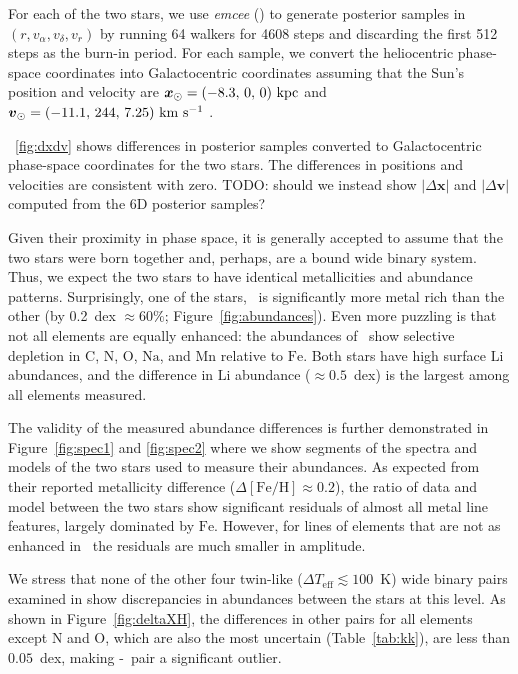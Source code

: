 \documentclass[modern, letterpaper]{aastex61}
\newcommand{\project}[1]{\textsl{#1}}
\newcommand{\figname}{Figure}
\newcommand*\elem[1]{\ensuremath{\mathrm{#1}}}
\newcommand*\elemH[1]{\ensuremath{[\mathrm{#1}/\elem{H}]}}
\newcommand*{\feh}{\ensuremath{\elemH{Fe}}}
\newcommand{\sunanalog}{\text{Krios}}
\newcommand{\bizarreone}{\text{Kronos}}
\newcommand{\bs}[1]{\boldsymbol{#1}}
\renewcommand{\vec}[1]{\bs{#1}}
\newcommand{\kms}{\ensuremath{\rm km~s^{-1}}}
\newcommand{\todo}[1]{{\color{blue}TODO: #1}}
\renewcommand\tablename{Table}
\begin{document}
%
For each of the two stars, we use \project{emcee}
(\citealt{2013PASP..125..306F}) to generate posterior samples in $(r, v_\alpha,
v_\delta, v_r)$ by running 64 walkers for 4608 steps and discarding the first
512 steps as the burn-in period.
For each sample, we convert the heliocentric phase-space coordinates into
Galactocentric coordinates assuming that the Sun's position and velocity are
$\vec x_\odot = (-8.3,\,0,\,0)~{\rm kpc}$ and $\vec v_\odot =
(-11.1,\,244,\,7.25)~\kms$ \citep[e.g.,][]{Schonrich:2010, Schonrich:2012}.

\figurename~\ref{fig:dxdv} shows differences in posterior samples converted to
Galactocentric phase-space coordinates for the two stars.
The differences in positions and velocities are consistent with zero.
\todo{should we instead show $|\Delta\boldsymbol{x}|$ and
$|\Delta\boldsymbol{v}|$ computed from the 6D posterior samples?}

Given their proximity in phase space, it is generally accepted to assume that
the two stars were born together and, perhaps, are a bound wide binary system.
Thus, we expect the two stars to have identical metallicities and abundance patterns.
Surprisingly, one of the stars, \bizarreone\ is significantly more metal
rich than the other (by 0.2~dex $\approx 60\%$; \figname~\ref{fig:abundances}).
Even more puzzling is that not all elements are equally enhanced:
the abundances of \bizarreone\ show selective depletion in
\elem{C}, \elem{N}, \elem{O}, \elem{Na}, and \elem{Mn}
relative to \elem{Fe}.
Both stars have high surface \elem{Li} abundances, and the difference in
\elem{Li} abundance ($\approx 0.5$~dex) is the largest among all elements
measured.

The validity of the measured abundance differences is further demonstrated
in \figname~\ref{fig:spec1} and \ref{fig:spec2} where we show
segments of the spectra and models of the two stars
used to measure their abundances.
As expected from their reported metallicity difference ($\Delta\feh \approx 0.2$),
the ratio of data and model between the two stars show significant
residuals of almost all metal line features, largely dominated by \elem{Fe}.
However, for lines of elements that are not as enhanced in \bizarreone\,
the residuals are much smaller in amplitude.


We stress that none of the other four twin-like ($\Delta T_\mathrm{eff}
\lesssim 100$~K) wide binary pairs examined in \citealt{2016ApJS..225...32B}
show discrepancies in abundances between the stars at this level.
As shown in \figname~\ref{fig:deltaXH},
the differences in other pairs for all elements except \elem{N} and \elem{O},
which are also the most uncertain (\tablename~\ref{tab:kk}),
are less than $0.05$~dex, making \bizarreone-\sunanalog\ pair a significant outlier.
\end{document}
